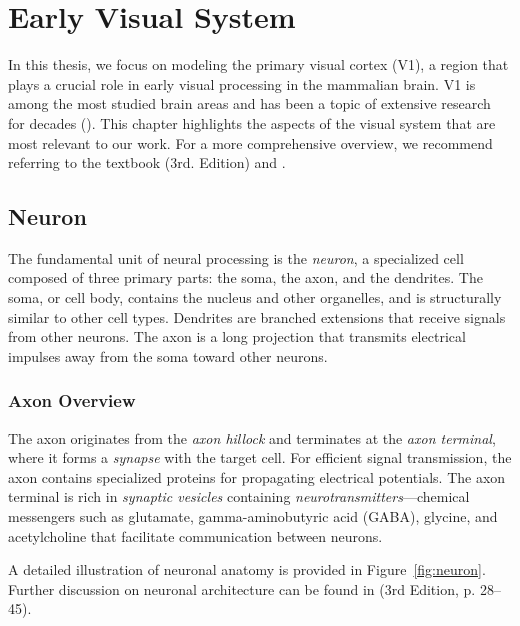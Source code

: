 \chapter{Early Visual System}
\label{chap:visual_system}

In this thesis, we focus on modeling the primary visual cortex (V1), a region that plays a crucial role in early visual processing in the mammalian brain. V1 is among the most studied brain areas and has been a topic of extensive research for decades (\citet{hubel1965receptive}). This chapter highlights the aspects of the visual system that are most relevant to our work. For a more comprehensive overview, we recommend referring to the textbook \citet{bear2020neuroscience} (3rd. Edition) and \citet{goebel2004visual}.

\section{Neuron}
\label{sec:neuron}

The fundamental unit of neural processing is the \emph{neuron}, a specialized cell composed of three primary parts: the soma, the axon, and the dendrites. The soma, or cell body, contains the nucleus and other organelles, and is structurally similar to other cell types. Dendrites are branched extensions that receive signals from other neurons. The axon is a long projection that transmits electrical impulses away from the soma toward other neurons.

\subsection{Axon Overview}
\label{subsec:axon}

The axon originates from the \emph{axon hillock} and terminates at the \emph{axon terminal}, where it forms a \emph{synapse} with the target cell. For efficient signal transmission, the axon contains specialized proteins for propagating electrical potentials. The axon terminal is rich in \emph{synaptic vesicles} containing \emph{neurotransmitters}—chemical messengers such as glutamate, gamma-aminobutyric acid (GABA), glycine, and acetylcholine that facilitate communication between neurons.

A detailed illustration of neuronal anatomy is provided in Figure~\ref{fig:neuron}. Further discussion on neuronal architecture can be found in \citet{bear2020neuroscience} (3rd Edition, p. 28--45).

